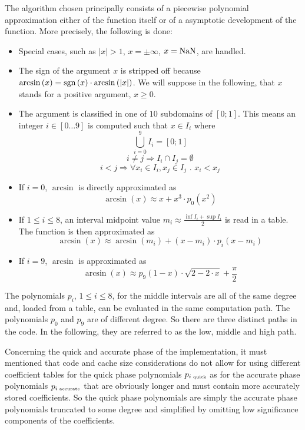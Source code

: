 The algorithm chosen principally consists of a piecewise polynomial
approximation either of the function itself or of a asymptotic
development of the function. More precisely, the following is done:
\begin{itemize}
\item Special cases, such as $\left \vert x \right \vert > 1$, $x = \pm \infty$, $x = \mathrm{NaN}$, are handled.
\item The sign of the argument $x$ is stripped off because
$\arcsin\left(x\right) = \mathrm{sgn}\left(x\right) \cdot \arcsin\left( \left
\vert x \right \vert \right)$. We will suppose in the following, that
$x$ stands for a positive argument, $x \geq 0$.
\item The argument is classified in one of $10$ subdomains of $\left[
0; 1 \right]$.  This means an integer $i \in \left[0\dots9\right]$ is
computed such that $x \in I_i$ where
$$\bigcup\limits_{i=0}^9 I_i = \left[0; 1 \right]$$
$$i \not= j \Rightarrow I_i \cap I_j = \emptyset$$
$$i < j \Rightarrow \forall x_i \in I_i, x_j \in I_j \mbox{ . } x_i < x_j$$
\item If $i = 0$, $\arcsin$ is directly approximated as
$$\arcsin\left( x \right) \approx x + x^3 \cdot p_0\left( x^2 \right)$$
\item If $1 \leq i \leq 8$, an interval midpoint value $m_i
\approx \frac{\inf I_i + \sup I_i}{2}$ is read in a table.  The function is
then approximated as
$$\arcsin\left( x \right) \approx \arcsin\left( m_i \right) +  \left(x - m_i \right) \cdot p_i\left( x - m_i \right)$$
\item If $i = 9$, $\arcsin$ is approximated as
$$\arcsin\left( x \right) \approx p_9\left( 1 - x \right) \cdot \sqrt{2 - 2\cdot x} + \frac{\pi}{2}$$
\end{itemize}
The polynomials $p_i$, $1 \leq i \leq 8$, for the middle intervals are
all of the same degree and, loaded from a table, can be evaluated in
the same computation path. The polynomials $p_0$ and $p_9$ are of
different degree. So there are three distinct paths in the code. In
the following, they are referred to as the low, middle and high path.

Concerning the quick and accurate phase of the implementation, it must
mentioned that code and cache size considerations do not allow for
using different coefficient tables for the quick phase polynomials
$p_{i\mbox{\tiny ~quick}}$ as for the accurate phase polynomials
$p_{i\mbox{\tiny ~accurate}}$ that are obviously longer and must contain
more accurately stored coefficients. So the quick phase polynomials are
simply the accurate phase polynomials truncated to some degree and simplified
by omitting low significance components of the coefficients.

